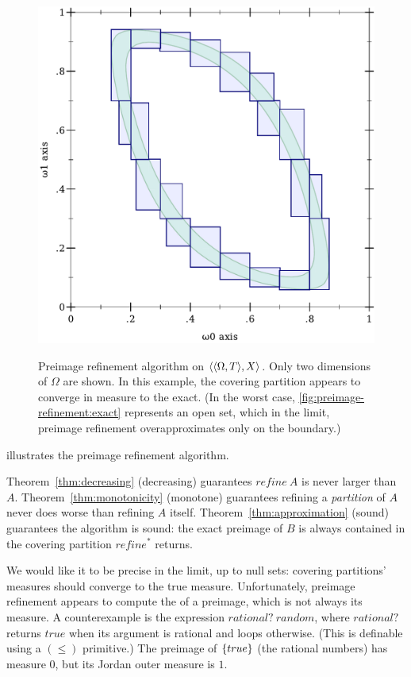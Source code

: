 \begin{figure}[tb!]
{\betweenrefinementfigurehspace%
\includegraphics[width=\subfigurewidth]{figures/refinement/constrained-norm-norm-source-11}%
}

\caption[Preimage refinement algorithm]{Preimage refinement algorithm on $\langle{\langle{\Omega,T}\rangle,X}\rangle$.
Only two dimensions of $\Omega$ are shown.
In this example, the covering partition appears to converge in measure to the exact. (In the worst case, \ref{fig:preimage-refinement:exact} represents an open set, which in the limit, preimage refinement overapproximates only on the boundary.)}
\label{fig:preimage-refinement}
\end{figure}

 illustrates the preimage refinement algorithm.

Theorem~\ref{thm:decreasing} (decreasing) guarantees $refine~A$ is never larger than $A$.
Theorem~\ref{thm:monotonicity} (monotone) guarantees refining a \emph{partition} of $A$ never does worse than refining $A$ itself.
Theorem~\ref{thm:approximation} (sound) guarantees the algorithm is sound: the exact preimage of $B$ is always contained in the covering partition $refine^*$ returns.

We would like it to be precise in the limit, up to null sets: covering partitions' measures should converge to the true measure.
Unfortunately, preimage refinement appears to compute the  of a preimage, which is not always its measure.
A counterexample is the expression $rational?~random$, where $rational?$ returns $true$ when its argument is rational and loops otherwise.
(This is definable using a $(\leq)$ primitive.)
The preimage of $\{{true}\}$ (the rational numbers) has measure $0$, but its Jordan outer measure is $1$.

